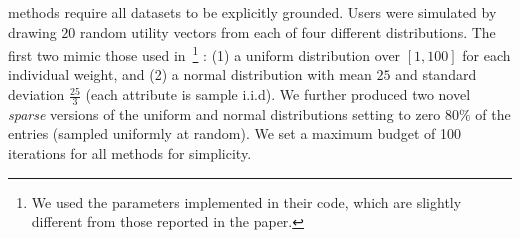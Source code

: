 \documentclass{article}
\renewcommand\[{\begin{equation}}
\renewcommand\]{\end{equation}}
\newcommand{\andrea}[1]{{\bf \textcolor{blue}{{\fbox{Andrea:} #1}}}}
\begin{document}
methods require all datasets to be explicitly grounded.  Users were
simulated by drawing $20$ random utility vectors from each of four
different distributions. The first two mimic those used
in~\cite{guo2010real}\footnote{We used the parameters implemented in their code, which are slightly different from those reported in the paper.}%
: (1) a uniform distribution over $[1, 100]$ for each
individual weight, and (2) a normal distribution with mean $25$
and %
standard deviation $\frac{25}{3}$ (each attribute is sample i.i.d).
We further produced two novel {\em sparse} versions of the uniform and
normal distributions setting to zero $80\%$ of the entries (sampled
uniformly at random). We set a maximum budget of 100 iterations for all
methods for simplicity.

\end{document}
